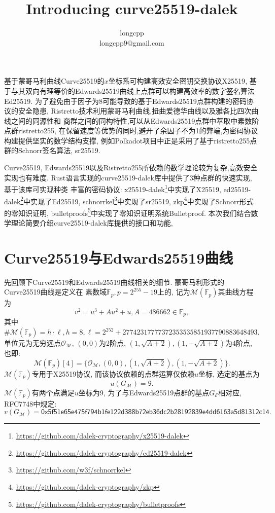 \documentclass{article}
\newcommand{\F}{\mathbb{F}}
\begin{document}
\title{Introducing \textsf{curve25519-dalek}}
\author{longcpp \\ \small{longcpp9@gmail.com}}

\maketitle

基于蒙哥马利曲线Curve25519的$x$坐标系可构建高效安全密钥交换协议\textsf{X25519},
基于与其双向有理等价的Edwards25519曲线上点群可以构建高效率的数字签名算法\textsf{Ed25519}.
为了避免由于因子为8可能导致的基于Edwards25519点群构建的密码协议的安全隐患,
Ristretto技术利用蒙哥马利曲线,扭曲爱德华曲线以及雅各比四次曲线之间的同源性和
商群之间的同构特性,可以从Edwards25519点群中萃取中素数阶点群\textsf{ristretto255}, 
在保留速度等优势的同时,避开了余因子不为1的弊端,为密码协议构建提供坚实的数学结构支撑,
例如Polkadot项目中正是采用了基于\textsf{ristretto255}点群的Schnorr签名算法, \textsf{sr25519}.

Curve25519, Edwards25519以及Ristretto255所依赖的数学理论较为复杂,高效安全实现也有难度.
Rust语言实现的\textsf{curve25519-dalek}库中提供了3种点群的快速实现, 基于该库可实现种类
丰富的密码协议: 
\textsf{x25519-dalek}\footnote{\url{https://github.com/dalek-cryptography/x25519-dalek}}中实现了\textsf{X25519},
\textsf{ed25519-dalek}\footnote{\url{https://github.com/dalek-cryptography/ed25519-dalek}}中实现了\textsf{Ed25519}, 
\textsf{schnorrkel}\footnote{\url{https://github.com/w3f/schnorrkel}}中实现了\textsf{sr25519},
\textsf{zkp}\footnote{\url{https://github.com/dalek-cryptography/zkp}}中实现了Schnorr形式的零知识证明, 
\textsf{bulletproofs}\footnote{\url{https://github.com/dalek-cryptography/bulletproofs}}中实现了零知识证明系统Bulletproof.
本次我们结合数学理论简要介绍\textsf{curve25519-dalek}库提供的接口和功能,

\section{Curve25519与Edwards25519曲线}

先回顾下Curve25519和Edwards25519曲线相关的细节. 蒙哥马利形式的Curve25519曲线是定义在
素数域$\F_p, p = 2^{255}-19$上的, 记为$\mathcal{M}(\F_p)$其曲线方程为
$$
v^2 = u^3 + Au^2 + u, A = 486662\in\F_p,
$$
其中$\#\mathcal{M}(\F_p) = h\cdot\ell, h = 8, 
\ell = 2^{252} + 27742317777372353535851937790883648493$.
单位元为无穷远点$\mathcal{O}_{\mathcal{M}}$, $(0,0)$为2阶点, 
$(1, \sqrt{A+2}), (1, -\sqrt{A+2})$为4阶点, 也即:
$$
\mathcal{M}(\F_p)[4] = \{ \mathcal{O}_{\mathcal{M}}, (0,0), (1, \sqrt{A+2}), (1, -\sqrt{A+2}) \}.
$$
$\mathcal{M}(\F_p)$专用于\textsf{X25519}协议, 而该协议依赖的点群运算仅依赖$u$坐标,
选定的基点为
$$
u(G_{\mathcal{M}}) = \textsf{9}.
$$
$\mathcal{M}(\F_p)$有两个点满足$u$坐标为9,
为了与Edwards25519点群的基点$G_{\mathcal{E}}$相对应, RFC7748中规定:
$$
v(G_{\mathcal{M}}) = 
\textsf{0x5f51e65e475f794b1fe122d388b72eb36dc2b28192839e4dd6163a5d81312c14}.
$$
\end{document}
